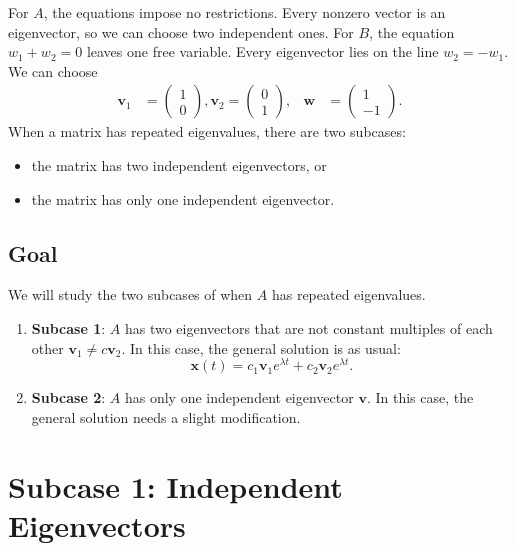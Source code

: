 \documentclass[11pt,letterpaper]{article}
\begin{document}
For $A$, the equations impose no restrictions. Every nonzero vector is an eigenvector, so we can choose two independent ones. For $B$, the equation $w_1+w_2=0$ leaves one free variable. Every eigenvector lies on the line $w_2=-w_1$. We can choose
\begin{align*}
    \mathbf{v}_1 &= \begin{pmatrix}
        1\\0
    \end{pmatrix}, \mathbf{v}_2=\begin{pmatrix}
        0\\1
    \end{pmatrix}, &
    \mathbf{w}&= \begin{pmatrix}
        1\\-1
    \end{pmatrix}.
\end{align*}
When a matrix has repeated eigenvalues, there are two subcases: 
\begin{itemize}
    \item[a)] the matrix has two independent eigenvectors, or
    \item[b)] the matrix has only one independent eigenvector.
\end{itemize}

\subsection{Goal}
We will study the two subcases of when $A$ has repeated eigenvalues.
\begin{enumerate}
    \item \textbf{Subcase 1}: $A$ has two eigenvectors that are not constant multiples of each other $\mathbf{v}_1\ne c\mathbf{v}_2$. In this case, the general solution is as usual:
     $$\mathbf{x}(t) = c_1 \mathbf{v}_1 e^{\lambda t} + c_2 \mathbf{v}_2 e^{\lambda t}.$$ 
     
    \item \textbf{Subcase 2}: $A$ has only one independent eigenvector $\mathbf{v}$. In this case, the general solution needs a slight modification.
\end{enumerate}


\section{Subcase 1: Independent Eigenvectors}
\end{document}
